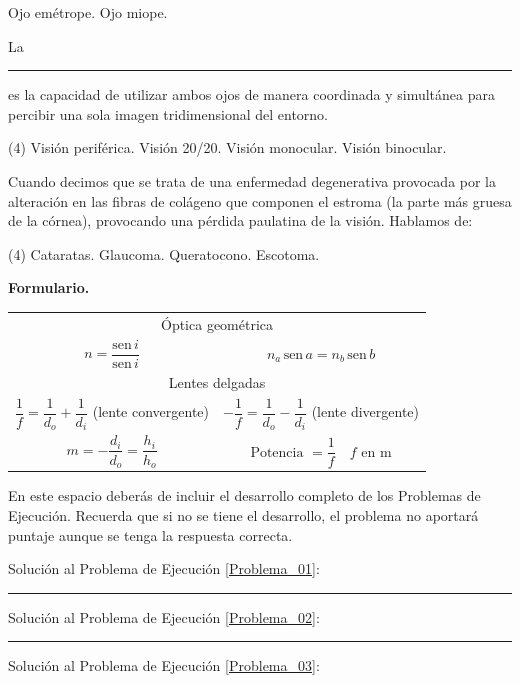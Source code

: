 \documentclass[12pt, letter]{exam}
\begin{document}
\begin{questions}
\begin{tasks}
        \task Ojo emétrope.
        \task Ojo miope.
    \end{tasks}
    \question  La \rule{2cm}{0.1mm} es la capacidad de utilizar ambos ojos de manera coordinada y simultánea para percibir una sola imagen tridimensional del entorno.
    \begin{tasks}(4)
        \task Visión periférica.
        \task Visión 20/20.
        \task Visión monocular.
        \task Visión binocular.
    \end{tasks}
    \question Cuando decimos que se trata de una enfermedad degenerativa provocada por la alteración en las fibras de colágeno que componen el estroma (la parte más gruesa de la córnea), provocando una pérdida paulatina de la visión. Hablamos de:
    \begin{tasks}(4)
        \task Cataratas.
        \task Glaucoma.
        \task Queratocono.
        \task Escotoma.
    \end{tasks}
\end{questions}

\newpage

\textbf{\huge{Formulario.}}
\begin{table}[H]
    \centering
    \setlength{\tabcolsep}{40pt}
    \renewcommand{\arraystretch}{2.5}
    \begin{tabular}{c  c}
        \multicolumn{2}{c}{Óptica geométrica} \\
        $n = \dfrac{\text{sen} \, i}{\text{sen} \, i}$ & $n_{a} \, \text{sen} \,  a = n_{b} \, \text{sen} \,  b$ \\ \hline
        \multicolumn{2}{c}{Lentes delgadas} \\
        $\dfrac{1}{f} = \dfrac{1}{d_{o}} + \dfrac{1}{d_{i}}$ (lente convergente) & $- \dfrac{1}{f} = \dfrac{1}{d_{o}} - \dfrac{1}{d_{i}}$ (lente divergente) \\
        $m = - \dfrac{d_{i}}{d_{o}} = \dfrac{h_{i}}{h_{o}}$ & $\text{Potencia } = \dfrac{1}{f} \quad f \text{ en } \unit{\meter}$ \\ \hline
\end{tabular}
\end{table}

En este espacio deberás de incluir el desarrollo completo de los Problemas de Ejecución. Recuerda que si no se tiene el desarrollo, el problema no aportará puntaje aunque se tenga la respuesta correcta.

\vspace*{0.5cm}
Solución al Problema de Ejecución \ref{Problema_01}:

\vspace*{4cm}
\rule{0.9\textwidth}{0.3mm}

Solución al Problema de Ejecución \ref{Problema_02}:

\vspace*{4.5cm}
\rule{0.9\textwidth}{0.3mm}

Solución al Problema de Ejecución \ref{Problema_03}:
\end{document}
